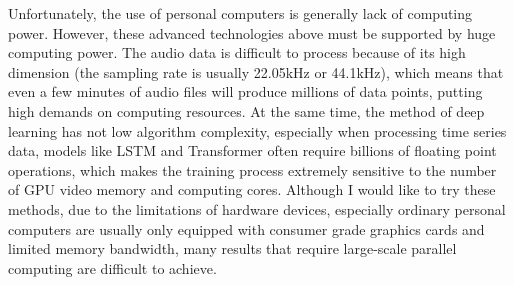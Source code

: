 Unfortunately, the use of personal computers is generally lack of computing power. However, these advanced technologies above must be supported by huge computing power. The audio data is difficult to process because of its high dimension (the sampling rate is usually 22.05kHz or 44.1kHz), which means that even a few minutes of audio files will produce millions of data points, putting high demands on computing resources. At the same time, the method of deep learning has not low algorithm complexity, especially when processing time series data, models like LSTM and Transformer often require billions of floating point operations, which makes the training process extremely sensitive to the number of GPU video memory and computing cores. Although I would like to try these methods, due to the limitations of hardware devices, especially ordinary personal computers are usually only equipped with consumer grade graphics cards and limited memory bandwidth, many results that require large-scale parallel computing are difficult to achieve.\\









